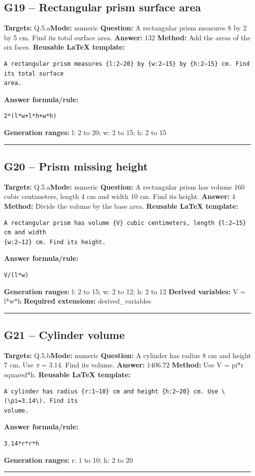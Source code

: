 \documentclass[11pt]{article}
\begin{document}
\subsection{G19 -- Rectangular prism surface area}
\textbf{Targets:} Q.5.a\quad\textbf{Mode:} numeric
\textbf{Question:} A rectangular prism measures 8 by 2 by 5 cm. Find its total surface area.
\textbf{Answer:} \(132\)
\textbf{Method:} Add the areas of the six faces.
\textbf{Reusable LaTeX template:}
\begin{verbatim}
A rectangular prism measures {l:2–20} by {w:2–15} by {h:2–15} cm. Find its total surface
area.
\end{verbatim}
\textbf{Answer formula/rule:}
\begin{verbatim}
2*(l*w+l*h+w*h)
\end{verbatim}
\textbf{Generation ranges:} l: 2 to 20; w: 2 to 15; h: 2 to 15
\medskip\hrule\medskip
\subsection{G20 -- Prism missing height}
\textbf{Targets:} Q.5.a\quad\textbf{Mode:} numeric
\textbf{Question:} A rectangular prism has volume 160 cubic centimeters, length 4 cm and width 10 cm. Find its height.
\textbf{Answer:} \(4\)
\textbf{Method:} Divide the volume by the base area.
\textbf{Reusable LaTeX template:}
\begin{verbatim}
A rectangular prism has volume {V} cubic centimeters, length {l:2–15} cm and width
{w:2–12} cm. Find its height.
\end{verbatim}
\textbf{Answer formula/rule:}
\begin{verbatim}
V/(l*w)
\end{verbatim}
\textbf{Generation ranges:} l: 2 to 15; w: 2 to 12; h: 2 to 12
\textbf{Derived variables:} V = l*w*h
\textbf{Required extensions:} derived\_variables
\medskip\hrule\medskip
\subsection{G21 -- Cylinder volume}
\textbf{Targets:} Q.5.b\quad\textbf{Mode:} numeric
\textbf{Question:} A cylinder has radius 8 cm and height 7 cm. Use \(\pi=3.14\). Find its volume.
\textbf{Answer:} \(1406.72\)
\textbf{Method:} Use V = pi*r squared*h.
\textbf{Reusable LaTeX template:}
\begin{verbatim}
A cylinder has radius {r:1–10} cm and height {h:2–20} cm. Use \(\pi=3.14\). Find its
volume.
\end{verbatim}
\textbf{Answer formula/rule:}
\begin{verbatim}
3.14*r*r*h
\end{verbatim}
\textbf{Generation ranges:} r: 1 to 10; h: 2 to 20
\medskip\hrule\medskip
\end{document}
